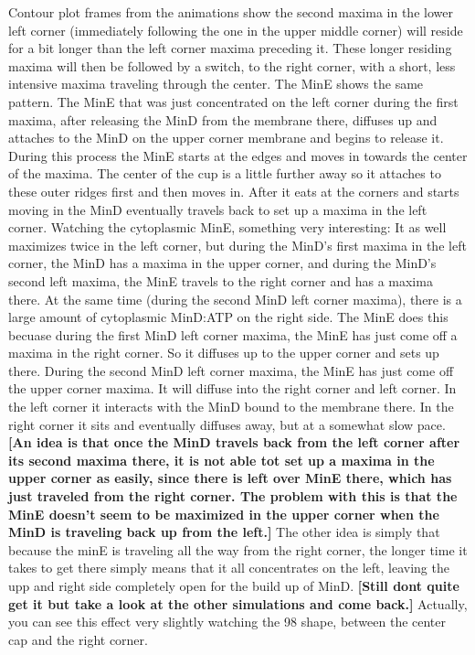 \documentclass[letterpaper,twocolumn,amsmath,amssymb,pre]{revtex4-1}
\newcommand{\red}[1]{{\bf \color{red} #1}}
\newcommand{\fixme}[1]{\red{[#1]}}
\begin{document}
Contour plot frames from the animations show the second maxima in the
lower left corner (immediately following the one in the upper middle
corner) will reside for a bit longer than the left corner maxima
preceding it.  These longer residing maxima will then be followed by a
switch, to the right corner, with a short, less intensive maxima
traveling through the center.  The MinE shows the same pattern. The
MinE that was just concentrated on the left corner during the first
maxima, after releasing the MinD from the membrane there, diffuses up
and attaches to the MinD on the upper corner membrane and begins to
release it.  During this process the MinE starts at the edges and
moves in towards the center of the maxima.  The center of the cup is a
little further away so it attaches to these outer ridges first and
then moves in.  After it eats at the corners and starts moving in the
MinD eventually travels back to set up a maxima in the left corner.
Watching the cytoplasmic MinE, something very interesting: It as well
maximizes twice in the left corner, but during the MinD's first maxima
in the left corner, the MinD has a maxima in the upper corner, and
during the MinD's second left maxima, the MinE travels to the right
corner and has a maxima there.  At the same time (during the second
MinD left corner maxima), there is a large amount of cytoplasmic
MinD:ATP on the right side.  The MinE does this becuase during the
first MinD left corner maxima, the MinE has just come off a maxima in
the right corner.  So it diffuses up to the upper corner and sets up
there.  During the second MinD left corner maxima, the MinE has just
come off the upper corner maxima.  It will diffuse into the right
corner and left corner.  In the left corner it interacts with the MinD
bound to the membrane there.  In the right corner it sits and
eventually diffuses away, but at a somewhat slow pace.  \fixme{An idea
  is that once the MinD travels back from the left corner after its
  second maxima there, it is not able tot set up a maxima in the upper
  corner as easily, since there is left over MinE there, which has
  just traveled from the right corner.  The problem with this is that
  the MinE doesn't seem to be maximized in the upper corner when the
  MinD is traveling back up from the left.}  The other idea is simply
that because the minE is traveling all the way from the right corner,
the longer time it takes to get there simply means that it all
concentrates on the left, leaving the upp and right side completely
open for the build up of MinD.  \fixme{Still dont quite get it but
  take a look at the other simulations and come back.} Actually, you
can see this effect very slightly watching the 98 shape, between the
center cap and the right corner.
\end{document}
